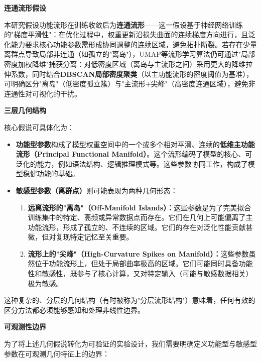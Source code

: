 \documentclass[letterpaper,twocolumn,10pt]{article}
\begin{document}
\textbf{连通流形假设}

本研究假设功能流形在训练收敛后为\textbf{连通流形}——这一假设基于神经网络训练的"梯度平滑性"：在优化过程中，权重更新沿损失曲面的连续梯度方向进行，且泛化能力要求核心功能参数需形成协同调整的连续区域，避免拓扑断裂。若存在少量离群点导致局部非连通（如孤立的"离岛"），UMAP等流形学习算法仍可通过"局部密度加权降维"捕获分离：对低密度区域（离岛与主流形之间）采用更大的降维拉伸系数，同时结合\textbf{DBSCAN局部密度聚类}（以主功能流形的密度阈值为基准），可明确区分"离岛"（低密度孤立簇）与"主流形+尖峰"（高密度连通区域），避免非连通性对可视化的干扰。

\textbf{三层几何结构}

核心假说可具体化为：

\begin{itemize}
\item \textbf{功能型参数}构成了模型权重空间中的一个或多个相对平滑、连续的\textbf{低维主功能流形（Principal Functional Manifold）}。这个流形编码了模型的核心、可泛化的能力，例如语法结构、逻辑推理模式等。这些参数协同工作，构成了模型稳健功能的基础。

\item \textbf{敏感型参数（离群点）}则可能表现为两种几何形态：
\begin{enumerate}
\item \textbf{远离流形的"离岛"（Off-Manifold Islands）：}这些参数是为了完美拟合训练集中的特定、高频或异常数据点而存在。它们在几何上可能偏离了主功能流形，形成了孤立的、不连续的区域。它们的存在对泛化性能贡献甚微，但对复现特定记忆至关重要。

\item \textbf{流形上的"尖峰"（High-Curvature Spikes on Manifold）：}这些参数虽然位于功能流形上，但处于局部曲率极高的区域。它们可能同时具备功能性和敏感性，既参与了核心计算，又对特定输入（可能与敏感数据相关）极为敏感。
\end{enumerate}
\end{itemize}

这种复杂的、分层的几何结构（有时被称为"分层流形结构"）意味着，任何有效的区分方法都必须能够感知和处理非线性边界。

\textbf{可观测性边界}

为了将上述几何假说转化为可验证的实验设计，我们需要明确定义功能型与敏感型参数在可观测几何特征上的边界：
\end{document}
